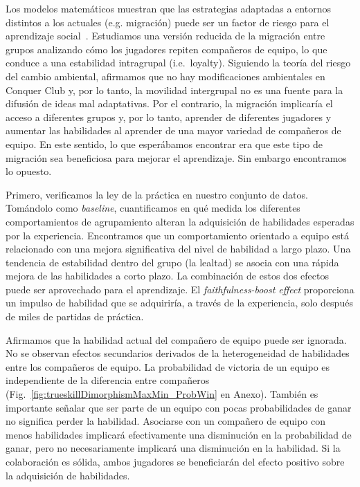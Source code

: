 \documentclass[a4paper,11pt]{book}
\theoremstyle{definition}
\begin{document}
Los modelos matemáticos muestran que las estrategias adaptadas a entornos distintos a los actuales (e.g. migración) puede ser un factor de riesgo para el aprendizaje social~\cite{boyd1989-socialLearningAsAdaptation}.
%
Estudiamos una versión reducida de la migración entre grupos analizando cómo los jugadores repiten compañeros de equipo, lo que conduce a una estabilidad intragrupal (i.e.~loyalty).
%
Siguiendo la teoría del riesgo del cambio ambiental, afirmamos que no hay modificaciones ambientales en Conquer Club y, por lo tanto, la movilidad intergrupal no es una fuente para la difusión de ideas mal adaptativas.
%
Por el contrario, la migración implicaría el acceso a diferentes grupos y, por lo tanto, aprender de diferentes jugadores y aumentar las habilidades al aprender de una mayor variedad de compañeros de equipo.
%
En este sentido, lo que esperábamos encontrar era que este tipo de migración sea beneficiosa para mejorar el aprendizaje.
%
Sin embargo encontramos lo opuesto.


Primero, verificamos la ley de la práctica en nuestro conjunto de datos.
%
%
Tomándolo como \emph{baseline}, cuantificamos en qué medida los diferentes comportamientos de agrupamiento alteran la adquisición de habilidades esperadas por la experiencia.
%
Encontramos que un comportamiento orientado a equipo está relacionado con una mejora significativa del nivel de habilidad a largo plazo.
%
Una tendencia de estabilidad dentro del grupo (la lealtad) se asocia con una rápida mejora de las habilidades a corto plazo.
%
La combinación de estos dos efectos puede ser aprovechado para el aprendizaje.
%
El \emph{faithfulness-boost effect} proporciona un impulso de habilidad que se adquiriría, a través de la experiencia, solo después de miles de partidas de práctica.


Afirmamos que la habilidad actual del compañero de equipo puede ser ignorada.
%
No se observan efectos secundarios derivados de la heterogeneidad de habilidades entre los compañeros de equipo.
%
La probabilidad de victoria de un equipo es independiente de la diferencia entre compañeros (Fig.~\ref{fig:trueskillDimorphismMaxMin_ProbWin} en Anexo).
%
También es importante señalar que ser parte de un equipo con pocas probabilidades de ganar no significa perder la habilidad.
%
Asociarse con un compañero de equipo con menos habilidades implicará efectivamente una disminución en la probabilidad de ganar, pero no necesariamente implicará una disminución en la habilidad.
%
Si la colaboración es sólida, ambos jugadores se beneficiarán del efecto positivo sobre la adquisición de habilidades.
\end{document}
